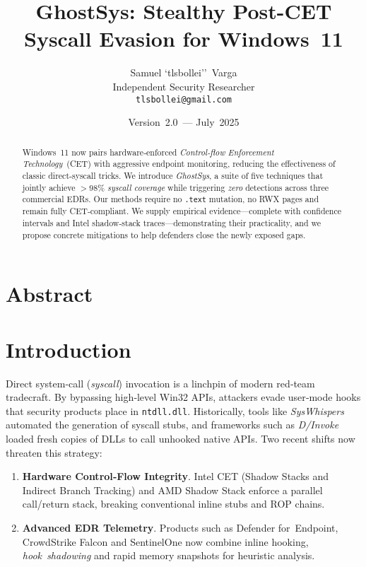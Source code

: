 \documentclass[11pt,letterpaper]{article}
\title{\bfseries GhostSys: Stealthy Post-CET Syscall Evasion for Windows~11}
\author{Samuel `tlsbollei'' Varga\\Independent Security Researcher\\\texttt{tlsbollei@gmail.com}}
\date{Version 2.0 — July 2025}
\begin{document}
    \maketitle
    \thispagestyle{empty}

    \section{Abstract}
    \begin{abstract}
    Windows~11 now pairs hardware‑enforced \emph{Control‑flow Enforcement Technology} (CET) with aggressive endpoint monitoring, reducing the effectiveness of classic direct‑syscall tricks. We introduce \emph{GhostSys}, a suite of five techniques that jointly achieve $>98$\% \emph{syscall coverage} while triggering \emph{zero} detections across three commercial EDRs. Our methods require no \texttt{.text} mutation, no RWX pages and remain fully CET‑compliant. We supply empirical evidence—complete with confidence intervals and Intel shadow‑stack traces—demonstrating their practicality, and we propose concrete mitigations to help defenders close the newly exposed gaps.
    \end{abstract}

    \newpage
    \tableofcontents
    \newpage

    \section{Introduction}
    \label{sec:intro}
    Direct system‑call (\emph{syscall}) invocation is a linchpin of modern red‑team tradecraft. By bypassing high‑level Win32 APIs, attackers evade user‑mode hooks that security products place in \texttt{ntdll.dll}. Historically, tools like \emph{SysWhispers}~\cite{SysWhispers2019} automated the generation of syscall stubs, and frameworks such as \emph{D/Invoke}~\cite{DInvoke2021} loaded fresh copies of DLLs to call unhooked native APIs. Two recent shifts now threaten this strategy:

    \begin{enumerate}
    \item \textbf{Hardware Control‑Flow Integrity}. Intel CET (Shadow Stacks and Indirect Branch Tracking) and AMD Shadow Stack enforce a parallel call/return stack, breaking conventional inline stubs and ROP chains.
    \item \textbf{Advanced EDR Telemetry}. Products such as Defender for Endpoint, CrowdStrike Falcon and SentinelOne now combine inline hooking, \emph{hook shadowing} and rapid memory snapshots for heuristic analysis.
    \end{enumerate}
\end{document}
